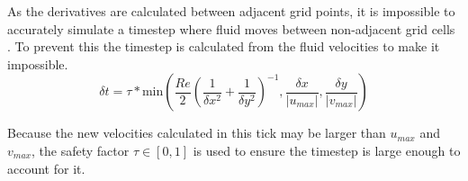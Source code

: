 As the derivatives are calculated between adjacent grid points, it is impossible to accurately simulate a timestep where fluid moves between non-adjacent grid cells .
To prevent this the timestep \deltaT{} is calculated from the fluid velocities to make it impossible.
\begin{equation}
    \delta{t} = \tau * \text{min}\left(
        \frac{Re}{2}\left(
            \frac{1}{\delta{x}^2} + \frac{1}{\delta{y}^2}
        \right)^{-1},
        \frac{\delta{x}}{|u_{max}|},
        \frac{\delta{y}}{|v_{max}|}
    \right)
\end{equation}

Because the new velocities calculated in this tick may be larger than $u_{max}$ and $v_{max}$, the safety factor $\tau \in [0, 1]$ is used to ensure the timestep is large enough to account for it\cite{TOME1994171}.

